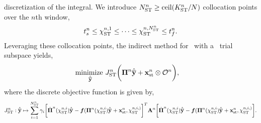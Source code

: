 discretization of the integral. We introduce $N_{\text{ST}}^{n} \ge \text{ceil}(K_{\text{ST}}^{n}/ N )$  collocation points over the $n$th window, 
$$t_s^{n} \le \chi_{\text{ST}}^{n,1} \le \cdots \le \chi_{\text{ST}}^{n,N_{\text{ST}}^{n}} \le t_f^{n}.$$
Leveraging these collocation points, the indirect method for \methodAcronym\ with a \spaceTimeAcronym\ trial subspace yields,
\begin{equation}\label{eq:obj_gen_slab2} 
\begin{split}
&\underset{\stgenstatey}{\text{minimize }} \objectiveDiscreteSTArg{n} \bigg( \stbasisArgnt{n} \stgenstatey + \stateInterceptSTArg{n} \otimes \onesFunctionArg{n}  \bigg) , %
\end{split} 
\end{equation}
where the discrete objective function is given by, 
$$J_{\text{ST}}^{n}: \hat{\mathbf{\overline{y}}} \mapsto \sum_{i=1}^{N_{\text{ST}}^{n}} \gamma_i 
\bigg[ \dot{\boldsymbol \Pi}^{n}(\chi_{\text{ST}}^{n,i}) \hat{\mathbf{\overline{y}}}^{ }  - \boldsymbol f (\boldsymbol \Pi^{n}(\chi_{\text{ST}}^{n,i}) \hat{\mathbf{\overline{y}}}^{ } + \mathbf{x}_\text{st}^{n},\chi_{\text{ST}}^{n,i,)} \bigg]^T 
\mathbf{A}^{n} 
\bigg[ \dot{\boldsymbol \Pi}^{n}(\chi_{\text{ST}}^{n,i}) \hat{\mathbf{\overline{y}}}^{ }  - \boldsymbol f (\boldsymbol \Pi^{n}(\chi_{\text{ST}}^{n,i}) \hat{\mathbf{\overline{y}}}^{ } + \mathbf{x}_\text{st}^{n},\chi_{\text{ST}}^{n,i,)} \bigg].
$$
